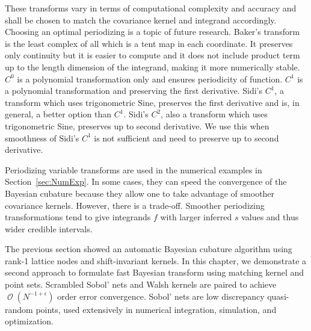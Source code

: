 \documentclass{iitthesis}          %
\DeclareMathOperator{\Order}{{\mathcal O}}
\newcommand\secref{Section~\ref}
\begin{document}
These transforms vary in terms of computational complexity and accuracy and shall be chosen to match the covariance kernel and integrand accordingly. Choosing an optimal periodizing is a topic of future research. Baker's transform is the least complex of all which is a tent map in each coordinate. It preserves only continuity but it is easier to compute and it does not include product term up to the length dimension of the integrand, making it more numerically stable. $C^0$ is a polynomial transformation only and ensures periodicity of function. $C^1$ is a polynomial transformation and preserving the first derivative.
Sidi's $C^1$, a transform which uses trigonometric Sine, preserves the first derivative and is, in general, a better option than $C^1$.
Sidi's $C^2$, also a transform which uses trigonometric Sine, preserves up to second derivative. We use this when smoothness of Sidi's $C^1$ is not sufficient and need to preserve up to second derivative.

Periodizing variable transforms are used in the numerical examples in \secref{sec:NumExp}. In some cases, they can speed the convergence of the Bayesian cubature because they allow one to take advantage of smoother covariance kernels. 
However, there is a trade-off.  Smoother periodizing transformations tend to give integrands $f$ with larger inferred $s$ values and thus wider credible intervals.

































\label{sec:sobol_walsh}


The previous section showed an automatic Bayesian cubature algorithm using rank-1 lattice nodes and shift-invariant kernels. 
In this chapter, we demonstrate a second approach to formulate fast Bayesian transform using matching kernel and point sets. 
Scrambled Sobol' nets and Walsh kernels are paired to achieve $\Order(N^{-1 + \epsilon})$  order error convergence. 
Sobol' nets \cite{Sob67} are low discrepancy quasi-random points, used extensively in numerical integration, simulation, and optimization. 
\end{document}
